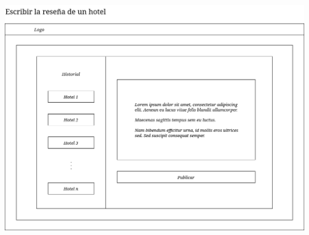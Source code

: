 \begin{center}
    \includegraphics[width=16cm, height=11cm]{img/wireframe_calificar_hotel.png}  
\end{center}


